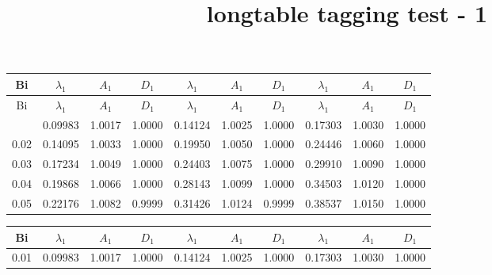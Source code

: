 \documentclass{article}
\title{longtable tagging test - 1}
\begin{document}
\begin{longtable}{|||c|ccc|ccc|ccc|||}
\hline\hline\hline
   Bi    & $\lambda_1$ & $A_1$ & $D_1$ & $\lambda_1$ & $A_1$ & $D_1$ & $\lambda_1$ & $A_1$ & $D_1$\rule{0pt}{10pt} \\  
\hline  
\endfirsthead
\hline\hline\hline
  Bi     & $\lambda_1$ & $A_1$ & $D_1$ & $\lambda_1$ & $A_1$ & $D_1$ & $\lambda_1$ & $A_1$ & $D_1$ \\ 
\hline
\endhead
\hline\hline\hline
\endfoot
\hline\hline\hline
\endlastfoot 
0.01   & 0.09983  & 1.0017  & 1.0000  & 0.14124   & 1.0025  & 1.0000  & 0.17303  & 1.0030  & 1.0000\rule{0pt}{10pt} \\ 
0.02   & 0.14095  & 1.0033  & 1.0000  & 0.19950   & 1.0050  & 1.0000  & 0.24446  & 1.0060  & 1.0000 \\ 
0.03   & 0.17234  & 1.0049  & 1.0000  & 0.24403   & 1.0075  & 1.0000  & 0.29910  & 1.0090  & 1.0000 \\ 
0.04   & 0.19868  & 1.0066  & 1.0000  & 0.28143   & 1.0099  & 1.0000  & 0.34503  & 1.0120  & 1.0000 \\  
0.05   & 0.22176  & 1.0082  & 0.9999  & 0.31426   & 1.0124  & 0.9999  & 0.38537  & 1.0150  & 1.0000 \\  
\end{longtable}

\begin{table}[b]
%
\begin{tabular}{|c|ccc|ccc|ccc|}
\hline
   Bi  & $\lambda_1$ & $A_1$ & $D_1$ & $\lambda_1$ & $A_1$ & $D_1$ & $\lambda_1$ & $A_1$ & $D_1$\rule{0pt}{10pt}  \\
\hline
0.01   & 0.09983  & 1.0017  & 1.0000  & 0.14124   & 1.0025  & 1.0000  & 0.17303  & 1.0030  & 1.0000\rule{0pt}{10pt} \\ 
\hline
\end{tabular}
\end{table}
\end{document}
